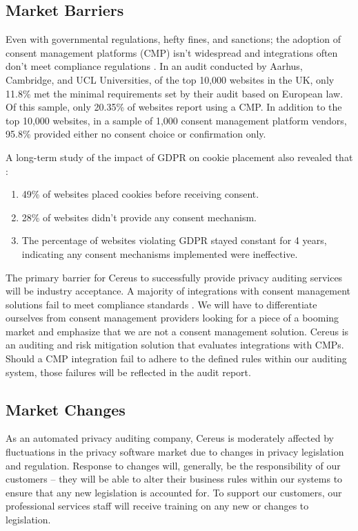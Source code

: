 \subsection{Market Barriers}

Even with governmental regulations, hefty fines, and sanctions; the adoption of consent management platforms (CMP) isn't widespread and integrations often don't meet compliance regulations \cite{nouwens.2020}. In an audit conducted by Aarhus, Cambridge, and UCL Universities, of the top 10,000 websites in the UK, only 11.8\% met the minimal requirements set by their audit based on European law. Of this sample, only 20.35\% of websites report using a CMP. In addition to the top 10,000 websites, in a sample of 1,000 consent management platform vendors, 95.8\% provided either no consent choice or confirmation only.

A long-term study of the impact of GDPR on cookie placement also revealed that \cite{trevisan.2019}:

\begin{enumerate}
  \item 49\% of websites placed cookies before receiving consent.
  \item 28\% of websites didn't provide any consent mechanism.
  \item The percentage of websites violating GDPR stayed constant for 4 years, indicating any consent mechanisms implemented were ineffective.
\end{enumerate}


\noindent
The primary barrier for Cereus to successfully provide privacy auditing services will be industry acceptance. A majority of integrations with consent management solutions fail to meet compliance standards \cite{nouwens.2020}. We will have to differentiate ourselves from consent management providers looking for a piece of a booming market and emphasize that we are not a consent management solution. Cereus is an auditing and risk mitigation solution that evaluates integrations with CMPs. Should a CMP integration fail to adhere to the defined rules within our auditing system, those failures will be reflected in the audit report.

\subsection{Market Changes}

As an automated privacy auditing company, Cereus is moderately affected by fluctuations in the privacy software market due to changes in privacy legislation and regulation. Response to changes will, generally, be the responsibility of our customers -- they will be able to alter their business rules within our systems to ensure that any new legislation is accounted for. To support our customers, our professional services staff will receive training on any new or changes to legislation.

